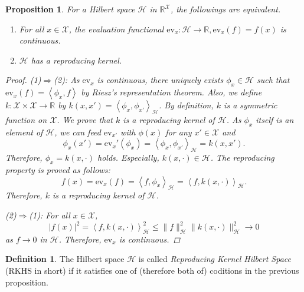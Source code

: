 \documentclass{amsart}
\newtheorem{proposition}[theorem]{Proposition}
\theoremstyle{definition}
\newtheorem{definition}[theorem]{Definition}
\theoremstyle{remark}
\numberwithin{equation}{section}
\begin{document}
\begin{proposition}\label{RKHS}
For a Hilbert space $\mathcal{H}$ in $\mathbb{R}^\mathcal{X}$, the followings are equivalent.
\begin{enumerate}
\item For all $x\in \mathcal{X}$, the evaluation functional $\mathrm{ev}_x: \mathcal{H}\to \mathbb{R}, \mathrm{ev}_x(f) = f(x)$ is continuous.
\item $\mathcal{H}$ has a reproducing kernel.
\end{enumerate}
\begin{proof}
(1)$\Rightarrow$(2): As $\mathrm{ev}_x$ is continuous, there uniquely exists $\phi_x\in \mathcal{H}$ such that $\mathrm{ev}_x(f) = \left<\phi_x, f\right>$ by Riesz's representation theorem.
Also, we define $k: \mathcal{X} \times \mathcal{X} \to \mathbb{R}$ by $k(x, x') = \left<\phi_x, \phi_{x'} \right>_\mathcal{H}$.
By definition, $k$ is a symmetric function on $\mathcal{X}$.
We prove that $k$ is a reproducing kernel of $\mathcal{H}$.
As $\phi_x$ itself is an element of $\mathcal{H}$, we can feed $\mathrm{ev}_{x'}$ with $\phi(x)$ for any $x'\in \mathcal{X}$ and
\begin{equation}
\phi_x(x') = \mathrm{ev}_x'(\phi_x) = \left< \phi_x, \phi_{x'} \right>_\mathcal{H} = k(x, x').
\end{equation}
Therefore, $\phi_x = k(x, \cdot)$ holds. Especially, $k(x, \cdot)\in \mathcal{H}$.
The reproducing property is proved as follows:
\begin{equation}
f(x) = \mathrm{ev}_x(f) = \left< f, \phi_x \right>_{\mathcal{H}} = \left< f, k(x, \cdot) \right>_{\mathcal{H}}.
\end{equation}
Therefore, $k$ is a reproducing kernel of $\mathcal{H}$.

(2)$\Rightarrow$(1): For all $x\in \mathcal{X}$,
\begin{equation}
|f(x)|^2 = \left<f, k(x, \cdot)\right>^2_\mathcal{H} \leq \|f\|_\mathcal{H}^2 \|k(x, \cdot)\|_\mathcal{H}^2 \to 0
\end{equation}
as $f\to 0$ in $\mathcal{H}$.
Therefore, $\mathrm{ev}_x$ is continuous.
\end{proof}
\end{proposition}

\begin{definition}
The Hilbert space $\mathcal{H}$ is called \textit{Reproducing Kernel Hilbert Space} (RKHS in short) if it satisfies one of (therefore both of) coditions in the previous proposition.
\end{definition}
\end{document}
